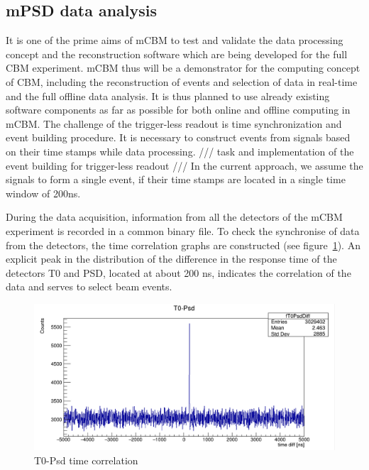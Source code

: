 \documentclass[a4paper,11pt]{article}
\begin{document}
\subsection{mPSD data analysis}
It is one of the prime aims of mCBM to test and validate the data processing concept and the reconstruction software which are being developed for the full CBM experiment. mCBM thus will be a demonstrator for the computing concept of CBM, including the reconstruction of events and selection of data in real-time and the full offline data analysis. It is thus planned to use already existing software components as far as possible for both online and offline computing in mCBM.
The challenge of the trigger-less readout is time synchronization and event building procedure. It is necessary to construct events from signals based on their time stamps while data processing.
/// task and implementation of the event building for trigger-less readout ///
In the current approach, we assume the signals to form a single event, if their time stamps are located in a single time window of 200ns.

During the data acquisition, information from all the detectors of the mCBM experiment is recorded in a common binary file. To check the synchronise of data from the detectors, the time correlation graphs are constructed (see figure~\ref{fig:6}). An explicit peak in the distribution of the difference in the response time of the detectors T0 and PSD, located at about 200 ns, indicates the correlation of the data and serves to select beam events.

\begin{figure}[htbp]
\centering %
\includegraphics[width=\textwidth]{run582T0Psd.png}

\caption{\label{fig:6} T0-Psd time correlation}
\end{figure}
\end{document}
